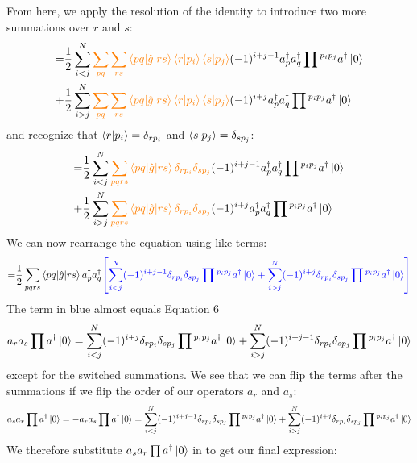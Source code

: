 \documentclass{article}
\newcommand{\dg}{\ensuremath{^\dagger} }
\begin{document}
From here, we apply the resolution of the identity to introduce two more summations over $r$ and $s$: 
\begin{align*}
= &\frac{1}{2} \sum\limits_{i < j} ^N  {\color{orange} \sum_{pq}  \sum_{rs}  \braket{pq | \hat{g} | rs } \braket{r| p_i} \braket{s | p_j} }(-1)^{i + j - 1}  a\dg_{p} a\dg_{q} \prod{}^{p_ip_j}a\dg \ket{0} \\
 + &\frac{1}{2} \sum\limits_{i > j} ^N  {\color{orange}  \sum_{pq}  \sum_{rs} \braket{pq | \hat{g} | rs} \braket{r| p_i} \braket{s | p_j} } (-1)^{i + j}   a\dg_{p}a\dg_{q} \prod{}^{p_ip_j}a\dg \ket{0}  \\
\end{align*}
and recognize that $ \braket{r| p_i}  = \delta_{rp_i}$ and $ \braket{s| p_j}  = \delta_{sp_j}$: 
\begin{align*}
= &\frac{1}{2} \sum\limits_{i < j} ^N  {\color{orange} \sum_{pqrs} \braket{pq | \hat{g} | rs }  \delta_{rp_i} \delta_{sp_j}}(-1)^{i + j - 1}  a\dg_{p} a\dg_{q} \prod{}^{p_ip_j}a\dg \ket{0} \\
 + &\frac{1}{2} \sum\limits_{i > j} ^N  {\color{orange}  \sum_{pqrs}  \braket{pq | \hat{g} | rs} \delta_{rp_i} \delta_{sp_j}} (-1)^{i + j}   a\dg_{p}a\dg_{q} \prod{}^{p_ip_j}a\dg \ket{0}  \\
\end{align*}
We can now rearrange the equation using like terms: 
\begin{align*}
= &\frac{1}{2}  \sum_{pqrs}  \braket{pq | \hat{g} | rs}  a\dg_{p}a\dg_{q} {\color{blue} \left[  \sum\limits_{i < j} ^N  (-1)^{i + j - 1}   \delta_{rp_i} \delta_{sp_j}  \prod{}^{p_ip_j} a\dg \ket{0} + 
\sum\limits_{i > j} ^N  (-1)^{i + j} \delta_{rp_i} \delta_{sp_j} \prod{}^{p_ip_j}a\dg \ket{0}  \right]} \\
\end{align*}
The term in {\color{blue} blue} almost equals Equation 6  
\[a_r a_s \prod a\dg \ket{0} = \sum\limits_{i < j} ^N  (-1)^{i + j }   \delta_{rp_i} \delta_{sp_j}  \prod{}^{p_ip_j} a\dg \ket{0} + 
\sum\limits_{i > j} ^N  (-1)^{i + j -1} \delta_{rp_i} \delta_{sp_j} \prod{}^{p_ip_j}a\dg \ket{0}
\]
except for the switched summations. 
We see that we can flip the terms after the summations if we flip the order of our operators $a_r$ and $a_s$: 
\[a_s a_r \prod a\dg \ket{0}  = - a_r a_s \prod a\dg \ket{0} = \sum\limits_{i < j} ^N  (-1)^{i + j -1 }   \delta_{rp_i} \delta_{sp_j}  \prod{}^{p_ip_j} a\dg \ket{0} + 
\sum\limits_{i > j} ^N  (-1)^{i + j } \delta_{rp_i} \delta_{sp_j} \prod{}^{p_ip_j}a\dg \ket{0}
\]
We therefore substitute $a_s a_r \prod a\dg \ket{0} $ in to get our final expression: 
\end{document}

